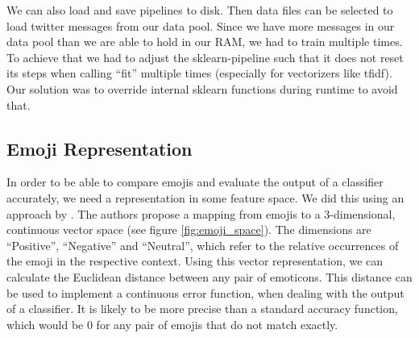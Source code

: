 \documentclass{article}
\begin{document}
We can also load and save pipelines to disk.
Then data files can be selected to load twitter messages from our data pool. Since we have more messages in our data pool than we are able to hold in our RAM, we had to train multiple times. To achieve that we had to adjust the sklearn-pipeline such that it does not reset its steps when calling “fit” multiple times (especially for vectorizers like tfidf). Our solution was to override internal sklearn functions during runtime to avoid that.

\subsection{Emoji Representation}
In order to be able to compare emojis and evaluate the output of a classifier accurately, we need a representation in some feature space. We did this using an approach by \citep{novak2015}. The authors propose a mapping from emojis to a 3-dimensional, continuous vector space (see figure \ref{fig:emoji_space}). The dimensions are “Positive”, “Negative” and “Neutral”, which refer to the relative occurrences of the emoji in the respective context. Using this vector representation, we can calculate the Euclidean distance between any pair of emoticons. This distance can be used to implement a continuous error function, when dealing with the output of a classifier. It is likely to be more precise than a standard accuracy function, which would be 0 for any pair of emojis that do not match exactly.
\end{document}
